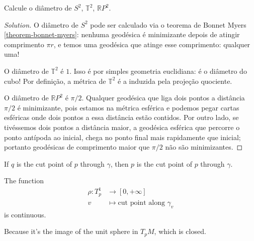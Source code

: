 \begin{exercise}[Diâmetros]
\label{exercise-diametros}
Calcule o diâmetro de $S^2$, $\mathbb{T}^2$, $\mathbb{R}P^{2}$.
\end{exercise}

\begin{proof}[Solution]
O diâmetro de $S^2$ pode ser calculado via o teorema de Bonnet Myers
\ref{theorem-bonnet-myers}: nenhuma geodésica é minimizante depois de atingir
comprimento $\pi r$, e temos uma geodésica que atinge esse comprimento: qualquer
uma!

O diâmetro de $\mathbb{T}^2$ é $1$. Isso é por simples geometria
euclidiana: é o diâmetro do cubo! Por definição, a métrica de  $\mathbb{T}^2$ é
a induzida pela projeção quociente.

O diâmetro de $\mathbb{R}P^{2}$ é $\pi/2$. Qualquer geodésica que liga dois
pontos a distância $\pi/2$ é minimizante, pois estamos na métrica esférica e
podemos pegar cartas esféricas onde dois pontos a essa distância estão contidos. 
Por outro lado, se tivéssemos dois pontos a distância maior, a geodésica 
esférica que percorre o ponto antípoda ao inicial, chega no ponto final mais 
rapidamente que inicial; portanto geodésicas de comprimento maior que $\pi/2$ 
não são minimizantes.
\end{proof}

\begin{lemma}
\label{lemma-cut-point-reflexive}
If $q$ is the cut point of $p$ through $\gamma$, then $p$ is the cut point of
$p$ through $\gamma$.
\end{lemma}

\begin{lemma}
\label{lemma-not-cut-locus-minimizing}

\end{lemma}

\begin{proposition}\leavevmode
The function
\begin{align*}
	\rho: T^1_p &\longrightarrow [0,+\infty] \\
	v &\longmapsto \text{cut point along }\gamma_v 
\end{align*}
is continuous.
\end{proposition}

\begin{lemma}
\label{lemma-cut-locus-closed}
Because it's the image of the unit sphere in $T_pM$, which is closed.
\end{lemma}

